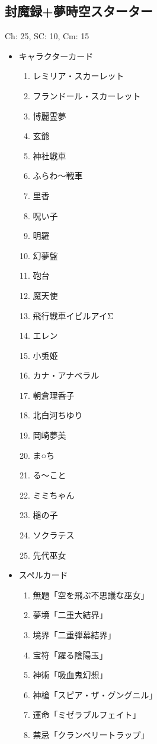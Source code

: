 \documentclass[line_length=22zw,number_of_lines=45,twocolumn]{jlreq}
\begin{document}
\subsection{封魔録+夢時空スターター}
Ch: 25, SC: 10, Cm: 15
\begin{itemize}
	\item キャラクターカード
		\begin{enumerate}
			\item レミリア・スカーレット
			\item フランドール・スカーレット
			\item 博麗霊夢
			\item 玄爺
			\item 神社戦車
			\item ふらわ〜戦車
			\item 里香
			\item 呪い子
			\item 明羅
			\item 幻夢盤
			\item 砲台
			\item 魔天使
			\item 飛行戦車イビルアイΣ
			\item エレン
			\item 小兎姫
			\item カナ・アナベラル
			\item 朝倉理香子
			\item 北白河ちゆり
			\item 岡崎夢美
			\item ま○ち
			\item る〜こと
			\item ミミちゃん
			\item 槌の子
			\item ソクラテス
			\item 先代巫女
		\end{enumerate}
	\item スペルカード
		\begin{enumerate}
			\item 無題「空を飛ぶ不思議な巫女」
			\item 夢境「二重大結界」
			\item 境界「二重弾幕結界」
			\item 宝符「躍る陰陽玉」
			\item 神術「吸血鬼幻想」
			\item 神槍「スピア・ザ・グングニル」
			\item 運命「ミゼラブルフェイト」
			\item 禁忌「クランベリートラップ」

\end{enumerate}
\end{itemize}
\end{document}
